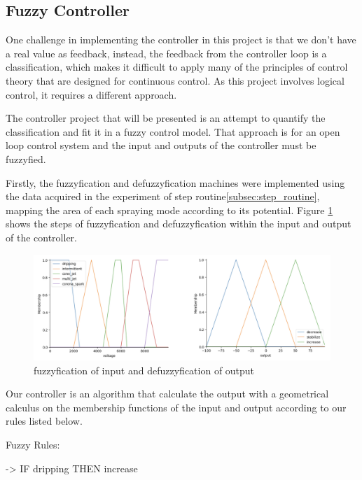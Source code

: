 \subsection{Fuzzy Controller}

        One challenge in implementing the controller in this project is that we don't have a real value as feedback, instead, the feedback from the controller loop is a classification, which makes it difficult to apply many of the principles of control theory that are designed for continuous control. 
        As this project involves logical control, it requires a different approach. 
        
        The controller project that will be presented is an attempt to quantify the classification and fit it in a fuzzy control model.
        That approach is for an open loop control system and the input and outputs of the controller must be fuzzyfied.

        Firstly, the fuzzyfication and defuzzyfication machines were implemented using the data acquired in the experiment of step routine\ref{subsec:step_routine}, mapping the area of each spraying mode according to its potential.
        Figure \ref{fig:fuzzyy} shows the steps of fuzzyfication and defuzzyfication within the input and output of the controller.


            \begin{figure}[H]
                \centering
                \includegraphics[width=17cm]{Figuras/fuzzy/Fuzzyy.png}
                \caption{fuzzyfication of input and defuzzyfication of output}
                \label{fig:fuzzyy}
            \end{figure}



        Our controller is an algorithm that calculate the output with a geometrical calculus on the membership functions of the input and output according to our rules listed below.

        Fuzzy Rules:

        -> IF dripping THEN increase

